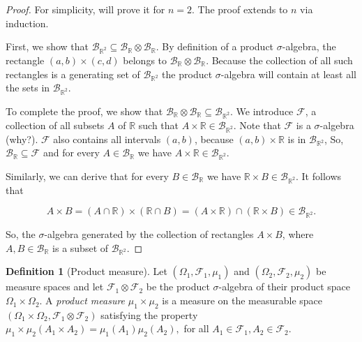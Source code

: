 \documentclass{book}
\theoremstyle{plain}%
\theoremstyle{definition}
\newtheorem{definition}{Definition}[section]
\begin{document}
\begin{proof}
For simplicity, will prove it for $n = 2$. The proof extends to $n$ via induction.

First, we show that $\mathcal{B}_{\mathbb{R}^2} \subseteq \mathcal{B}_\mathbb{R} \otimes \mathcal{B}_\mathbb{R}$. By definition of a product $\sigma$-algebra, the rectangle $(a,b) \times (c, d)$ belongs to $\mathcal{B}_\mathbb{R} \otimes \mathcal{B}_\mathbb{R}$. Because the collection of all such rectangles is a generating set of $\mathcal{B}_{\mathbb{R}^2}$ the product $\sigma$-algebra will contain at least all the sets in $\mathcal{B}_{\mathbb{R}^2}$.

To complete the proof, we show that $\mathcal{B}_\mathbb{R} \otimes \mathcal{B}_\mathbb{R} \subseteq \mathcal{B}_{\mathbb{R}^2}$. We introduce $\mathcal{F}$, a collection of all subsets $A$ of $\mathbb{R}$ such that $A \times \mathbb{R} \in \mathcal{B}_{\mathbb{R}^2}$. Note that $\mathcal{F}$ is a $\sigma$-algebra (why?). $\mathcal{F}$ also contains all intervals $(a, b)$, because $(a, b) \times \mathbb{R}$ is in $\mathcal{B}_{\mathbb{R}^2}$, So, $\mathcal{B}_\mathbb{R} \subseteq \mathcal{F}$ and for every $A \in \mathcal{B}_\mathbb{R}$ we have $A \times \mathbb{R} \in \mathcal{B}_{\mathbb{R}^2}$.

Similarly, we can derive that for every $B \in \mathcal{B}_\mathbb{R}$ we have $\mathbb{R}  \times B\in \mathcal{B}_{\mathbb{R}^2}$. It follows that 

$$A \times B = (A \cap \mathbb{R}) \times (\mathbb{R} \cap B) = (A \times \mathbb{R}) \cap (\mathbb{R} \times B) \in \mathcal{B}_{\mathbb{R}^2}.$$

So, the $\sigma$-algebra generated by the collection of rectangles $A \times B$, where $A, B \in \mathcal{B}_\mathbb{R}$ is a subset of $\mathcal{B}_{\mathbb{R}^2}$.
\end{proof}

\begin{definition}[Product measure] Let $(\Omega_1, \mathcal{F}_1, \mu_1)$ and $(\Omega_2, \mathcal{F}_2, \mu_2)$ be measure spaces and let $\mathcal{F}_1 \otimes \mathcal{F}_2$ be the product $\sigma$-algebra of their product space $\Omega_1 \times \Omega_2$. A \emph{product measure} $\mu_1 \times \mu_2$ is a measure on the measurable space $(\Omega_1 \times \Omega_2, \mathcal{F}_1 \otimes \mathcal{F}_2)$ satisfying the property $\mu_1 \times \mu_2(A_1 \times A_2) = \mu_1(A_1)\mu_2(A_2),$ for all $A_1 \in \mathcal{F}_1, A_2 \in \mathcal{F}_2$.
\end{definition}
\end{document}
